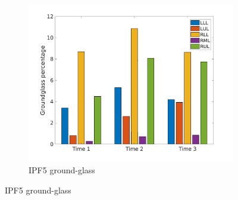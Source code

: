 \begin{figure}[H] 
\centering
\begin{subfigure}{.46\linewidth}%
  \includegraphics[width=\linewidth,trim={{.0\wd0} {.0\wd0} {.0\wd0} {.0\wd0}},clip]{Appendix/Image_AppexA/LobarDistribution/IPF5GroundglassLobarRegionDiseaseDistributionOverTime.jpg} %
  \caption{IPF5 ground-glass}
  \label{fig:IPF5LobarRegionDiseaseDistributionOverTime-a} 
\end{subfigure} 
\hspace{.3in}

\end{figure}
